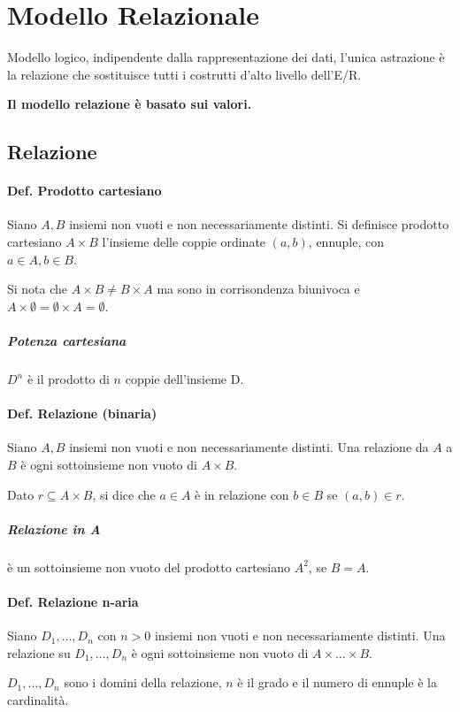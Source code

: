 \section{Modello Relazionale}
Modello logico, indipendente dalla rappresentazione dei dati, l'unica astrazione è la relazione che sostituisce tutti i costrutti d'alto livello dell'E/R.

\textbf{Il modello relazione è basato sui valori.}
\subsection{Relazione}
\paragraph{Def. Prodotto cartesiano} Siano $A, B$ insiemi non vuoti e non necessariamente distinti. Si definisce prodotto cartesiano $A\times B$ l'insieme delle coppie ordinate $(a, b)$, ennuple, con $a\in A, b\in B$.

Si nota che $A\times B\ne B\times A$ ma sono in corrisondenza biunivoca e $A\times\emptyset=\emptyset\times A=\emptyset$.
\subparagraph{Potenza cartesiana} $D^n$ è il prodotto di $n$ coppie dell'insieme D.

\paragraph{Def. Relazione (binaria)} Siano $A, B$ insiemi non vuoti e non necessariamente distinti. Una relazione da $A$ a $B$ è ogni sottoinsieme non vuoto di $A\times B$.

Dato $r\subseteq A\times B$, si dice che $a\in A$ è in relazione con $b\in B$ se $(a, b)\in r$.

\subparagraph{Relazione in A} è un sottoinsieme non vuoto del prodotto cartesiano $A^2$, se $B=A$.

\paragraph{Def. Relazione n-aria} Siano $D_1,\dots,D_n$ con $n>0$ insiemi non vuoti e non necessariamente distinti. Una relazione su $D_1,\dots,D_n$ è ogni sottoinsieme non vuoto di $A\times\dots\times B$.

$D_1,\dots,D_n$ sono i domini della relazione, $n$ è il grado e il numero di ennuple è la cardinalità.

